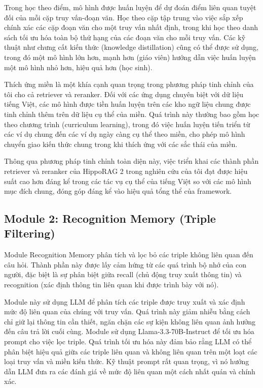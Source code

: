 \documentclass[../main.tex]{subfiles}
\begin{document}
Trong học theo điểm, mô hình được huấn luyện để dự đoán điểm liên quan tuyệt đối của mỗi cặp truy vấn-đoạn văn. Học theo cặp tập trung vào việc sắp xếp chính xác các cặp đoạn văn cho một truy vấn nhất định, trong khi học theo danh sách tối ưu hóa toàn bộ thứ hạng của các đoạn văn cho mỗi truy vấn. Các kỹ thuật như chưng cất kiến thức (knowledge distillation) cũng có thể được sử dụng, trong đó một mô hình lớn hơn, mạnh hơn (giáo viên) hướng dẫn việc huấn luyện một mô hình nhỏ hơn, hiệu quả hơn (học sinh).

Thích ứng miền là một khía cạnh quan trọng trong phương pháp tinh chỉnh của tôi cho cả retriever và reranker. Đối với các ứng dụng chuyên biệt với dữ liệu tiếng Việt, các mô hình được tiền huấn luyện trên các kho ngữ liệu chung được tinh chỉnh thêm trên dữ liệu cụ thể của miền. Quá trình này thường bao gồm học theo chương trình (curriculum learning), trong đó việc huấn luyện tiến triển từ các ví dụ chung đến các ví dụ ngày càng cụ thể theo miền, cho phép mô hình chuyển giao kiến thức chung trong khi thích ứng với các sắc thái của miền.

Thông qua phương pháp tinh chỉnh toàn diện này, việc triển khai các thành phần retriever và reranker của HippoRAG 2 trong nghiên cứu của tôi đạt được hiệu suất cao hơn đáng kể trong các tác vụ cụ thể của tiếng Việt so với các mô hình mục đích chung, đóng góp đáng kể vào hiệu quả tổng thể của framework.

\subsection{Module 2: Recognition Memory (Triple Filtering)}
Module Recognition Memory phân tích và lọc bỏ các triple không liên quan đến câu hỏi. Thành phần này được lấy cảm hứng từ các quá trình bộ nhớ của con người, đặc biệt là sự phân biệt giữa recall (chủ động truy xuất thông tin) và recognition (xác định thông tin liên quan khi được trình bày với nó). 

Module này sử dụng LLM để phân tích các triple được truy xuất và xác định mức độ liên quan của chúng với truy vấn. Quá trình này giảm nhiễu bằng cách chỉ giữ lại thông tin cần thiết, ngăn chặn các sự kiện không liên quan ảnh hưởng đến câu trả lời cuối cùng. Module sử dụng Llama-3.3-70B-Instruct để tối ưu hóa prompt cho việc lọc triple. Quá trình tối ưu hóa này đảm bảo rằng LLM có thể phân biệt hiệu quả giữa các triple liên quan và không liên quan trên một loạt các loại truy vấn và miền kiến thức. Kỹ thuật prompt rất quan trọng, vì nó hướng dẫn LLM đưa ra các đánh giá về mức độ liên quan một cách nhất quán và chính xác.
\end{document}
